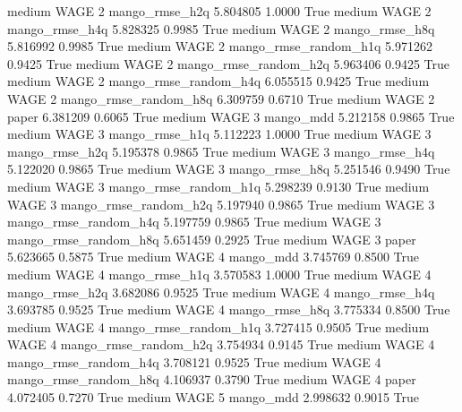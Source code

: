     medium     WAGE                 2        mango_rmse_h2q   5.804805      1.0000    True
    medium     WAGE                 2        mango_rmse_h4q   5.828325      0.9985    True
    medium     WAGE                 2        mango_rmse_h8q   5.816992      0.9985    True
    medium     WAGE                 2 mango_rmse_random_h1q   5.971262      0.9425    True
    medium     WAGE                 2 mango_rmse_random_h2q   5.963406      0.9425    True
    medium     WAGE                 2 mango_rmse_random_h4q   6.055515      0.9425    True
    medium     WAGE                 2 mango_rmse_random_h8q   6.309759      0.6710    True
    medium     WAGE                 2                 paper   6.381209      0.6065    True
    medium     WAGE                 3             mango_mdd   5.212158      0.9865    True
    medium     WAGE                 3        mango_rmse_h1q   5.112223      1.0000    True
    medium     WAGE                 3        mango_rmse_h2q   5.195378      0.9865    True
    medium     WAGE                 3        mango_rmse_h4q   5.122020      0.9865    True
    medium     WAGE                 3        mango_rmse_h8q   5.251546      0.9490    True
    medium     WAGE                 3 mango_rmse_random_h1q   5.298239      0.9130    True
    medium     WAGE                 3 mango_rmse_random_h2q   5.197940      0.9865    True
    medium     WAGE                 3 mango_rmse_random_h4q   5.197759      0.9865    True
    medium     WAGE                 3 mango_rmse_random_h8q   5.651459      0.2925    True
    medium     WAGE                 3                 paper   5.623665      0.5875    True
    medium     WAGE                 4             mango_mdd   3.745769      0.8500    True
    medium     WAGE                 4        mango_rmse_h1q   3.570583      1.0000    True
    medium     WAGE                 4        mango_rmse_h2q   3.682086      0.9525    True
    medium     WAGE                 4        mango_rmse_h4q   3.693785      0.9525    True
    medium     WAGE                 4        mango_rmse_h8q   3.775334      0.8500    True
    medium     WAGE                 4 mango_rmse_random_h1q   3.727415      0.9505    True
    medium     WAGE                 4 mango_rmse_random_h2q   3.754934      0.9145    True
    medium     WAGE                 4 mango_rmse_random_h4q   3.708121      0.9525    True
    medium     WAGE                 4 mango_rmse_random_h8q   4.106937      0.3790    True
    medium     WAGE                 4                 paper   4.072405      0.7270    True
    medium     WAGE                 5             mango_mdd   2.998632      0.9015    True
